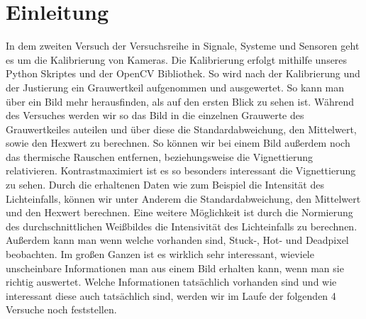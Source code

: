 \documentclass[12pt, oneside, a4paper, \docLanguage]{report}
\begin{document}

\setcounter{section}{0}



\clearpage

%
%


%
%


%
%


%
%




\setcounter{page}{1} 
\pagestyle{default}
%
%
\chapter{Einleitung}
\label{chap:EINL}
In dem zweiten Versuch der Versuchsreihe in Signale, Systeme und Sensoren geht es um die Kalibrierung von Kameras. 
\newline 
Die Kalibrierung erfolgt mithilfe unseres Python Skriptes und der OpenCV Bibliothek. So wird nach der Kalibrierung und der Justierung ein Grauwertkeil aufgenommen und ausgewertet. 
\newline
\newline
So kann man über ein Bild mehr herausfinden, als auf den ersten Blick zu sehen ist. 
\newline
Während des Versuches werden wir so das Bild in die einzelnen Grauwerte des Grauwertkeiles auteilen und über diese die Standardabweichung, den Mittelwert, sowie den Hexwert zu berechnen.
\newline
\newline
So können wir bei einem Bild außerdem noch das thermische Rauschen entfernen, beziehungsweise die Vignettierung relativieren.
Kontrastmaximiert ist es so besonders interessant die Vignettierung zu sehen.
\newline
Durch die erhaltenen Daten wie zum Beispiel die Intensität des Lichteinfalls, können wir unter Anderem die Standardabweichung, den Mittelwert und den Hexwert berechnen.
Eine weitere Möglichkeit ist durch die Normierung des durchschnittlichen Weißbildes die Intensivität des Lichteinfalls zu berechnen.
Außerdem kann man wenn welche vorhanden sind, Stuck-, Hot- und Deadpixel beobachten.
\newline
Im großen Ganzen ist es wirklich sehr interessant, wieviele unscheinbare Informationen man aus einem Bild erhalten kann, wenn man sie richtig auswertet. 
Welche Informationen tatsächlich vorhanden sind und wie interessant diese auch tatsächlich sind, werden wir im Laufe der folgenden 4 Versuche noch feststellen.
\end{document}
